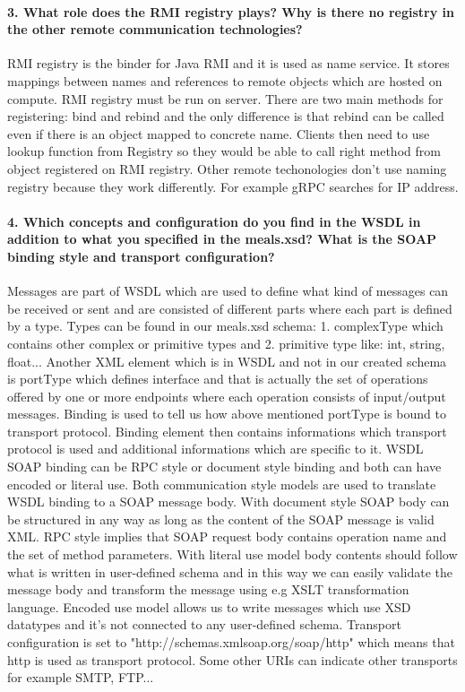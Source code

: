 \documentclass{ds-report}
\begin{document}
	
	
	\paragraph{3. What role does the RMI registry plays? Why is there no registry in the other remote communication technologies? \newline}
	RMI registry is the binder for Java RMI and it is used as name service. It stores mappings between names and references to remote objects which
	are hosted on compute. RMI registry must be run on server. There are two main methods for registering: bind and rebind and the only difference is
	that rebind can be called even if there is an object mapped to concrete name. Clients then need to use lookup function from Registry so they would be
	able to call right method from object registered on RMI registry. Other remote techonologies don't use naming registry because they 
	work differently. For example gRPC searches for IP address.
	
	\paragraph{4. Which concepts and configuration do you find in the WSDL in addition to what you specified in the meals.xsd? What is the SOAP binding style and transport configuration?}
	Messages are part of WSDL which are used to define what kind of messages can
	be received or sent and are consisted of different parts where each part is defined by a type. Types can be found in our meals.xsd schema: 1. complexType which contains other complex or
 	primitive types and 2. primitive type like: int, string, float... Another XML element which is in WSDL and not in our created schema is portType which defines interface and that is actually
 	the set of operations offered by one or more endpoints where each operation consists of input/output messages. Binding is used to tell us how above mentioned portType is bound to transport
 	protocol. Binding element then contains informations which transport protocol is used and additional informations which are specific to it. WSDL SOAP binding can be RPC style or document style
 	binding and both can have encoded or literal use. Both communication style models are used to translate WSDL binding to a SOAP message body. With document style SOAP body can be 
	structured in any way as long as the content of the SOAP message is valid XML. RPC style implies that SOAP request body contains operation name and the set of method parameters. With literal 
	use model body contents should follow what is written in user-defined schema and in this way we can easily validate the message body and transform the message using e.g XSLT transformation
	language. Encoded use model allows us to write messages which use XSD datatypes and it's not connected to any user-defined schema. Transport configuration is set to
	"http://schemas.xmlsoap.org/soap/http" which means that http is used as transport protocol. Some other URIs can indicate other transports for example SMTP, FTP...
	
	\clearpage
	
	
\end{document}
